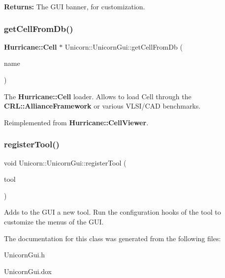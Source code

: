 {\bfseries Returns\+:} The G\+UI banner, for customization. \mbox{\label{classUnicorn_1_1UnicornGui_a698cb62a4c8df9fd6b7d626fb44cc439}} 
\subsubsection{\texorpdfstring{get\+Cell\+From\+Db()}{getCellFromDb()}}
{\footnotesize\ttfamily \textbf{ Hurricane\+::\+Cell} $\ast$ Unicorn\+::\+Unicorn\+Gui\+::get\+Cell\+From\+Db (\begin{DoxyParamCaption}\item[{const char $\ast$}]{name }\end{DoxyParamCaption})\hspace{0.3cm}{\ttfamily [virtual]}}

The \textbf{ Hurricane\+::\+Cell} loader. Allows to load Cell through the \textbf{ C\+R\+L\+::\+Alliance\+Framework} or various V\+L\+S\+I/\+C\+AD benchmarks. 

Reimplemented from \textbf{ Hurricane\+::\+Cell\+Viewer}.

\mbox{\label{classUnicorn_1_1UnicornGui_a89346bccf1908c92786987d046aa6175}} 
\subsubsection{\texorpdfstring{register\+Tool()}{registerTool()}}
{\footnotesize\ttfamily void Unicorn\+::\+Unicorn\+Gui\+::register\+Tool (\begin{DoxyParamCaption}\item[{\textbf{ Graphic\+Tool} $\ast$}]{tool }\end{DoxyParamCaption})}

Adds to the G\+UI a new tool. Run the configuration hooks of the {\ttfamily tool} to customize the menus of the G\+UI. 

The documentation for this class was generated from the following files\+:\begin{DoxyCompactItemize}
\item 
Unicorn\+Gui.\+h\item 
Unicorn\+Gui.\+dox\end{DoxyCompactItemize}
